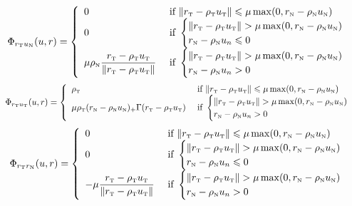 \begin{equation}
  \label{eq:Phi-AC-II-rtun}
  \Phi_{r_\t u_\n}(u,r) =
  \left\{
    \begin{array}{ll}
      0 & \text{ if }  \|r_{\t}  - \rho_{\t} u_{\t}\| \leq  \mu \max (0 ,r_{\n} - \rho_{\n} u_\n )  \\
      0 & \text{ if }
      \begin{cases}
        \|r_{\t}  - \rho_{\t} u_{\t}\| >  \mu \max (0 ,r_{\n} - \rho_{\n} u_\n )  \\
        r_{\n} - \rho_{\n} u_n\leq 0
      \end{cases} \\
     \mu \rho_{\n}  \Frac{r_{\t} - \rho_{\t} u_{\t} }{ \| r_{\t} - \rho_{\t} u_{\t}\| }   &  \text{ if }
      \begin{cases}
        \|r_{\t}  - \rho_{\t} u_{\t}\| >  \mu \max (0 ,r_{\n} - \rho_{\n} u_\n )  \\
        r_{\n} - \rho_{\n} u_n > 0
      \end{cases} \\
    \end{array}\right.
\end{equation}
\begin{equation}
  \label{eq:Phi-AC-II-rtut}
  \Phi_{r_\t u_\t}(u,r) =
  \left\{
    \begin{array}{ll}
      \rho_{\t} & \text{ if }  \|r_{\t}  - \rho_{\t} u_{\t}\| \leq  \mu \max (0 ,r_{\n} - \rho_{\n} u_\n )  \\
     \mu\rho_{\t}(r_{\n} - \rho_{\n} u_\n )_+ \Gamma(r_{\t} - \rho_{\t} u_{\t})
      &  \text{ if }
      \begin{cases}
        \|r_{\t}  - \rho_{\t} u_{\t}\| >  \mu \max (0 ,r_{\n} - \rho_{\n} u_\n )  \\
        r_{\n} - \rho_{\n} u_n > 0
      \end{cases} \\
    \end{array}\right.
\end{equation}
\begin{equation}
  \label{eq:Phi-AC-II-rtrn}
  \Phi_{r_\t r_\n}(u,r) =
  \left\{
    \begin{array}{ll}
      0 & \text{ if }  \|r_{\t}  - \rho_{\t} u_{\t}\| \leq  \mu \max (0 ,r_{\n} - \rho_{\n} u_\n )  \\
      0 & \text{ if }
      \begin{cases}
        \|r_{\t}  - \rho_{\t} u_{\t}\| >  \mu \max (0 ,r_{\n} - \rho_{\n} u_\n )  \\
        r_{\n} - \rho_{\n} u_n\leq 0
      \end{cases} \\
       -\mu  \Frac{r_{\t} - \rho_{\t} u_{\t} }{ \| r_{\t} - \rho_{\t} u_{\t}\| }  &  \text{ if }
      \begin{cases}
        \|r_{\t}  - \rho_{\t} u_{\t}\| >  \mu \max (0 ,r_{\n} - \rho_{\n} u_\n )  \\
         r_{\n} - \rho_{\n} u_n > 0
      \end{cases} \\
    \end{array}\right.
\end{equation}
